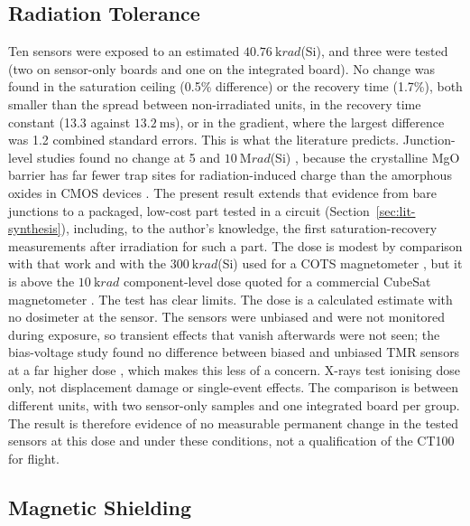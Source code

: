 \documentclass[12pt,a4paper]{article}
\begin{document}
\subsection{Radiation Tolerance}
\label{sec:disc-radiation}

Ten sensors were exposed to an estimated $\SI{40.76}{\kilo rad}$(Si), and three were tested (two on sensor-only boards and one on the integrated board). No change was found in the saturation ceiling (0.5\% difference) or the recovery time (1.7\%), both smaller than the spread between non-irradiated units, in the recovery time constant (13.3 against $\SI{13.2}{\milli\second}$), or in the gradient, where the largest difference was 1.2 combined standard errors. This is what the literature predicts. Junction-level studies found no change at 5 and $\SI{10}{\mega rad}$(Si) \cite{tmr-bias-radiation,ren2012}, because the crystalline MgO barrier has far fewer trap sites for radiation-induced charge than the amorphous oxides in CMOS devices \cite{tid-basics-lanl}. The present result extends that evidence from bare junctions to a packaged, low-cost part tested in a circuit (Section~\ref{sec:lit-synthesis}), including, to the author's knowledge, the first saturation-recovery measurements after irradiation for such a part. The dose is modest by comparison with that work and with the $\SI{300}{\kilo rad}$(Si) used for a COTS magnetometer \cite{regoli2020}, but it is above the $\SI{10}{\kilo rad}$ component-level dose quoted for a commercial CubeSat magnetometer \cite{nss_magnetometer}. The test has clear limits. The dose is a calculated estimate with no dosimeter at the sensor. The sensors were unbiased and were not monitored during exposure, so transient effects that vanish afterwards were not seen; the bias-voltage study found no difference between biased and unbiased TMR sensors at a far higher dose \cite{tmr-bias-radiation}, which makes this less of a concern. X-rays test ionising dose only, not displacement damage or single-event effects. The comparison is between different units, with two sensor-only samples and one integrated board per group. The result is therefore evidence of no measurable permanent change in the tested sensors at this dose and under these conditions, not a qualification of the CT100 for flight.

\subsection{Magnetic Shielding}
\label{sec:disc-shielding}
\end{document}
